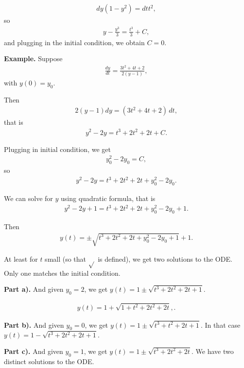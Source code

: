 \documentclass{article}
\begin{document}
\begin{align*}
  dy(1-y^2) = dt t^2,
\end{align*}
so
\begin{align*}
  y - \frac{y^3}{3} = \frac{t^3}{3} + C,
\end{align*}
and plugging in the initial condition, we obtain $C = 0$.

{\bf Example.} Suppose
\begin{align*}
  \frac{dy}{dt} = \frac{3t^2 + 4t + 2}{2(y-1)},
\end{align*}
with $y(0) = y_0$.

Then
\begin{align*}
  2(y-1) dy = (3t^2 + 4t + 2) \, dt,
\end{align*}
that is
\begin{align*}
  y^2 - 2y = t^3 + 2t^2 + 2t + C.
\end{align*}

Plugging in initial condition, we get
\begin{align*}
  y_0^2 - 2y_0 = C,
\end{align*}
so
\begin{align*}
  y^2 - 2y = t^3 + 2t^2 + 2t + y_0^2 - 2y_0.
\end{align*}

We can solve for $y$ using quadratic formula, that is
\begin{align*}
  y^2 - 2y + 1 = t^3 + 2t^2 + 2t + y_0^2 - 2y_0 + 1.
\end{align*}

Then
\begin{align*}
  y(t) = \pm \sqrt{t^3 + 2t^2 + 2t + y_0^2 - 2y_0 + 1} + 1.
\end{align*}


At least for $t$ small (so that $\sqrt{}$ is defined), we get two solutions to the ODE.  Only one matches the initial condition.

{\bf Part a).} And given $y_0= 2$, we get  $y(t) = 1 \pm \sqrt{t^3 + 2t^2 + 2t + 1}$.

\begin{align*}
  y(t) = 1 + \sqrt{1 + t^2 + 2t^2 + 2t},.
\end{align*}

{\bf Part b).} And given $y_0 = 0$, we get $y(t) = 1 \pm \sqrt{t^3 + t^2 + 2t + 1}$.  In that case $y(t) = 1 - \sqrt{t^3 + 2t^2 + 2t + 1}$.

{\bf Part c).} And given $y_0 = 1$, we get  $y(t) = 1 \pm \sqrt{t^3 + 2t^2 + 2t}$.  We have two distinct solutions to the ODE.
\end{document}
